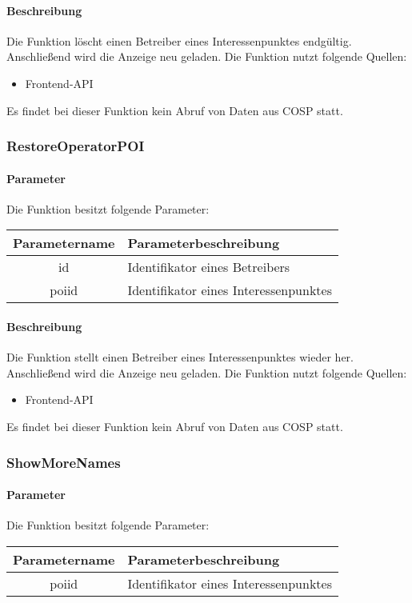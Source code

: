 \paragraph{Beschreibung} Die Funktion löscht einen Betreiber eines Interessenpunktes endgültig. Anschließend wird die Anzeige neu geladen. Die Funktion nutzt folgende Quellen:
\begin{itemize}
	\item Frontend-API
\end{itemize}
Es findet bei dieser Funktion kein Abruf von Daten aus {\glqq COSP\grqq} statt.
\subsubsection{RestoreOperatorPOI}
\paragraph{Parameter} Die Funktion besitzt folgende Parameter:
\begin{table}[H]
	\begin{tabular}{|c|p{11cm}|}
		\hline
		\textbf{Parametername} & \textbf{Parameterbeschreibung} \\ \hline
		id    & Identifikator eines Betreibers \\ \hline
		poiid & Identifikator eines Interessenpunktes \\ \hline
	\end{tabular}
\end{table}
\paragraph{Beschreibung} Die Funktion stellt einen Betreiber eines Interessenpunktes wieder her. Anschließend wird die Anzeige neu geladen. Die Funktion nutzt folgende Quellen:
\begin{itemize}
	\item Frontend-API
\end{itemize}
Es findet bei dieser Funktion kein Abruf von Daten aus {\glqq COSP\grqq} statt.
\subsubsection{ShowMoreNames}
\paragraph{Parameter} Die Funktion besitzt folgende Parameter:
\begin{table}[H]
	\begin{tabular}{|c|p{11cm}|}
		\hline
		\textbf{Parametername} & \textbf{Parameterbeschreibung} \\ \hline
		poiid & Identifikator eines Interessenpunktes \\ \hline
	\end{tabular}
\end{table}
